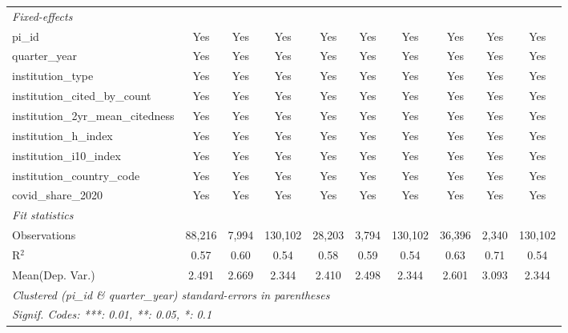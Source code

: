 \begin{tabular}{lccccccccc}
   \midrule
   \emph{Fixed-effects}\\
   pi\_id                                                      & Yes           & Yes            & Yes           & Yes           & Yes            & Yes           & Yes           & Yes            & Yes\\  
   quarter\_year                                               & Yes           & Yes            & Yes           & Yes           & Yes            & Yes           & Yes           & Yes            & Yes\\  
   institution\_type                                           & Yes           & Yes            & Yes           & Yes           & Yes            & Yes           & Yes           & Yes            & Yes\\  
   institution\_cited\_by\_count                               & Yes           & Yes            & Yes           & Yes           & Yes            & Yes           & Yes           & Yes            & Yes\\  
   institution\_2yr\_mean\_citedness                           & Yes           & Yes            & Yes           & Yes           & Yes            & Yes           & Yes           & Yes            & Yes\\  
   institution\_h\_index                                       & Yes           & Yes            & Yes           & Yes           & Yes            & Yes           & Yes           & Yes            & Yes\\  
   institution\_i10\_index                                     & Yes           & Yes            & Yes           & Yes           & Yes            & Yes           & Yes           & Yes            & Yes\\  
   institution\_country\_code                                  & Yes           & Yes            & Yes           & Yes           & Yes            & Yes           & Yes           & Yes            & Yes\\  
   covid\_share\_2020                                          & Yes           & Yes            & Yes           & Yes           & Yes            & Yes           & Yes           & Yes            & Yes\\  
   \midrule
   \emph{Fit statistics}\\
   Observations                                                & 88,216        & 7,994          & 130,102       & 28,203        & 3,794          & 130,102       & 36,396        & 2,340          & 130,102\\  
   R$^2$                                                       & 0.57          & 0.60           & 0.54          & 0.58          & 0.59           & 0.54          & 0.63          & 0.71           & 0.54\\  
Mean(Dep. Var.) & 2.491 & 2.669 & 2.344 & 2.410 & 2.498 & 2.344 & 2.601 & 3.093 & 2.344 \\
   \midrule \midrule
   \multicolumn{10}{l}{\emph{Clustered (pi\_id \& quarter\_year) standard-errors in parentheses}}\\
   \multicolumn{10}{l}{\emph{Signif. Codes: ***: 0.01, **: 0.05, *: 0.1}}\\
\end{tabular}
\par\endgroup
